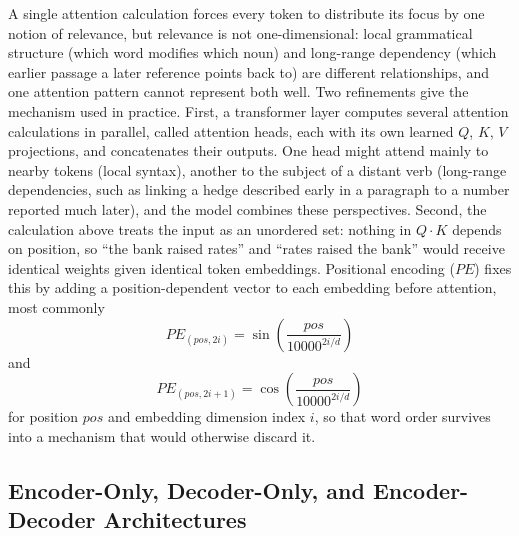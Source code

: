 \documentclass[../ai_in_finance]{subfiles}
\begin{document}
A single attention calculation forces every token to distribute its focus by one notion of relevance, but relevance is not one-dimensional: local grammatical structure (which word modifies which noun) and long-range dependency (which earlier passage a later reference points back to) are different relationships, and one attention pattern cannot represent both well. Two refinements give the mechanism used in practice. First, a transformer layer computes several
attention calculations in parallel, called attention heads, each with its own learned $Q$, $K$, $V$ projections, and concatenates their outputs.
One head might attend mainly to nearby tokens (local syntax), another to the subject of a distant
verb (long-range dependencies, such as linking a hedge described early in a paragraph to a number reported much later),
and the model combines these perspectives. Second, the calculation above
treats the input as an unordered set: nothing in $Q \cdot K$ depends on position, so ``the bank raised rates'' and ``rates
raised the bank'' would receive identical weights given identical token embeddings. Positional encoding ($PE$) fixes this by
adding a position-dependent vector to each embedding before attention, most commonly
$$PE_{(pos, 2i)} = \sin\left(\frac{pos}{10000^{2i/d}}\right)$$
and
$$PE_{(pos,2i+1)} = \cos\left(\frac{pos}{10000^{2i/d}}\right)$$
for position $pos$ and embedding dimension index $i$, so that word order survives into a mechanism that would otherwise discard it.

\subsection{Encoder-Only, Decoder-Only, and Encoder-Decoder Architectures}
\label{sec:transformer-architectures}
\end{document}
